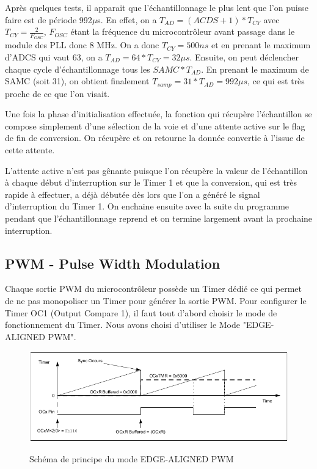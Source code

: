 \documentclass[11pt, french]{article} %
\begin{document}
\vspace{0.5cm}

Après quelques tests, il apparait que l'échantillonnage le plus lent que l'on puisse faire est de période 992$\mu$s. En effet, on a $T_{AD} = (ACDS+1) * T_{CY}$ avec $T_{CY} = \frac{2}{F_{OSC}}$, $F_{OSC}$ étant la fréquence du microcontrôleur avant passage dans le module des PLL donc 8 MHz. On a donc $T_{CY} = 500 ns$ et en prenant le maximum d'ADCS qui vaut 63, on a $T_{AD} = 64 * T_{CY} = 32 \mu s$. Ensuite, on peut déclencher chaque cycle d'échantillonnage tous les $SAMC * T_{AD}$. En prenant le maximum de SAMC (soit 31), on obtient finalement $T_{samp} = 31 * T_{AD} = 992 \mu s$, ce qui est très proche de ce que l'on visait.  

\vspace{0.5cm}

Une fois la phase d'initialisation effectuée, la fonction qui récupère l'échantillon se compose simplement d'une sélection de la voie et d'une attente active sur le flag de fin de conversion. On récupère et on retourne la donnée convertie à l'issue de cette attente. 

\vspace{0.5cm}

L'attente active n'est pas gênante puisque l'on récupère la valeur de l'échantillon à chaque début d'interruption sur le Timer 1 et que la conversion, qui est très rapide à effectuer, a déjà débutée dès lors que l'on a généré le signal d'interruption du Timer 1. On enchaine ensuite avec la suite du programme pendant que l'échantillonnage reprend et on termine largement avant la prochaine interruption.


\subsection{PWM - Pulse Width Modulation}

Chaque sortie PWM du microcontrôleur possède un Timer dédié ce qui permet de ne pas monopoliser un Timer pour générer la sortie PWM. Pour configurer le Timer OC1 (Output Compare 1), il faut tout d'abord choisir le mode de fonctionnement du Timer. Nous avons choisi d'utiliser le Mode "EDGE-ALIGNED PWM".

\vspace{0.5cm}

\begin{figure}[!h]
	\centering
	\includegraphics[width = 15cm]{SolutionAnalogique/PWMMode.png} 
	\label{pwm_mode}
	\caption{Schéma de principe du mode EDGE-ALIGNED PWM}
\end{figure}
\end{document}
